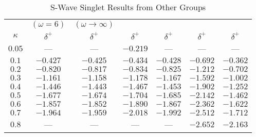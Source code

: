 \documentclass[Dissertation.tex]{subfiles}
\begin{document}
\begin{table}[H]
\centering
\begin{tabular}{c c c c c c c}
\toprule
 & $(\omega = 6)$ & $(\omega \rightarrow \infty)$ &  &  &  & \\
$\kappa$ & $\delta^+$ \cite{VanReeth2003} & $\delta^+$ \cite{VanReeth2003} & $\delta^+$ \cite{Blackwood2002} & $\delta^+$ \cite{Walters2004} & $\delta^+$ \cite{Ray1997} & $\delta^+$ \cite{Adhikari1999} \\
\midrule
$0.05$ & --- & --- & $-0.219$ & --- & --- & --- \\
$0.1$ & $-0.427$ & $-0.425$ & $-0.434$ & $-0.428$ & $-0.692$ & $-0.362$ \\
$0.2$ & $-0.820$ & $-0.817$ & $-0.834$ & $-0.825$ & $-1.212$ & $-0.702$ \\
$0.3$ & $-1.161$ & $-1.158$ & $-1.178$ & $-1.167$ & $-1.592$ & $-1.002$ \\
$0.4$ & $-1.446$ & $-1.443$ & $-1.467$ & $-1.453$ & $-1.902$ & $-1.252$ \\
$0.5$ & $-1.677$ & $-1.674$ & $-1.704$ & $-1.685$ & $-2.142$ & $-1.462$ \\
$0.6$ & $-1.857$ & $-1.852$ & $-1.890$ & $-1.867$ & $-2.362$ & $-1.622$ \\
$0.7$ & $-1.964$ & $-1.959$ & $-2.018$ & $-1.992$ & $-2.512$ & $-1.712$ \\
$0.8$ &    --- &    --- &    --- &    --- & $-2.652$ & $-2.163$ \\
\bottomrule
\end{tabular}
\caption{S-Wave Singlet Results from Other Groups}
\label{tab:SWaveSingletOther}
\end{table}

\end{document}
